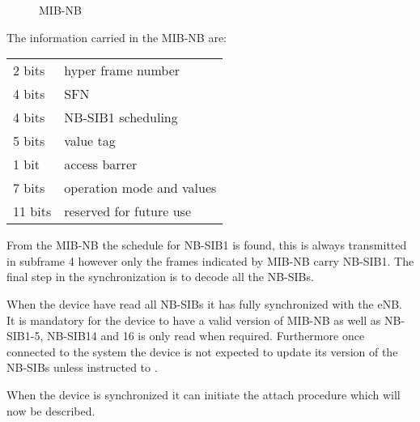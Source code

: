 \begin{figure}[H]
\centering

\caption{MIB-NB}
\label{fig:MIB-NB}
\end{figure}

The information carried in the \gls{MIB-NB} are:

\begin{tabular}{ll}\\
2 bits & hyper frame number\\
4 bits & \gls{SFN}\\
4 bits & \gls{NB-SIB}1 scheduling\\
5 bits & value tag\\
1 bit & access barrer\\
7 bits & operation mode and values\\
11 bits & reserved for future use\\
\end{tabular}

From the \gls{MIB-NB} the schedule for \gls{NB-SIB}1 is found, this is always transmitted in subframe 4 however only the frames indicated by \gls{MIB-NB} carry \gls{NB-SIB}1. The final step in the synchronization is to decode all the \gls{NB-SIB}s.

When the device have read all \gls{NB-SIB}s it has fully synchronized with the \gls{eNB}. It is mandatory for the device to have a valid version of \gls{MIB-NB} as well as \gls{NB-SIB}1-5, \gls{NB-SIB}14 and 16 is only read when required. Furthermore once connected to the system the device is not expected to update its version of the \gls{NB-SIB}s unless instructed to \citep{whitepaper}. 

When the device is synchronized it can initiate the attach procedure which will now be described. 




